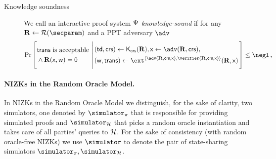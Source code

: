 \documentclass[runningheads,11pt]{llncs}
\theoremstyle{definition}
\begin{document}
\begin{description}
	\item[Knowledge soundness] We call an interactive proof system $\mathrm{\Psi}$ \emph{knowledge-sound} if for any $\REL \gets \RELGEN(\secparam)$ and a PPT adversary $\adv$
	\[
	\Pr\left[
		\begin{aligned}
			& \text{$\trans$ is acceptable} \\
			& \land \REL(\inp, \wit) = 0
	 \end{aligned}
	  \,\left|\,
	 \begin{aligned}
		 & (\td, \crs) \gets \kcrs(\REL), \inp \gets \adv(\REL,\crs), \\
		 & (\wit, \trans) \gets \ext^{\ip{\adv(\REL, \crs, \inp)}{\verifier(\REL, \crs, \inp)}}(\REL, \inp)
	 \end{aligned}
	 \vphantom{\begin{aligned}
		 \adv (\trans) = 1, \\
		 \text{if $\trans{}$ is accepting} \\
		 \pcind \text{then $\REL(\inp, \wit)$}
	 \end{aligned}}\right.
	 \right] \leq \negl\,,
 \]
\end{description}

\paragraph{NIZKs in the Random Oracle Model.}
In NIZKs in the Random Oracle Model we distinguish, for the sake of clarity, two simulators, one denoted by $\simulator_\zkproof$ that is responsible for providing simulated proofs and $\simulator_\ro$ that picks a random oracle instantiation and takes care of all parties' queries to $\mathcal{H}$.
For the sake of consistency (with random oracle-free NIZKs) we use $\simulator$
to denote the pair of state-sharing simulators $\simulator_\zkproof,
\simulator_\ro$.
\end{document}

